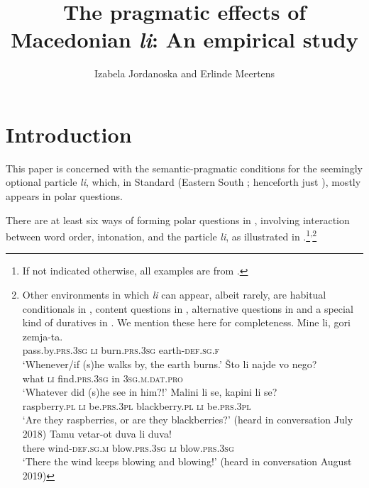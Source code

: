 \documentclass[output=paper,
colorlinks,
citecolor=brown,
newtxmath
]{langscibook}
\author{Izabela Jordanoska\affiliation{University of Vienna} and Erlinde Meertens\affiliation{University of Konstanz}}
\title[The pragmatic effects of Macedonian \textup{li}: An empirical study]
      {The pragmatic effects of Macedonian \textit{li}: An empirical study}
\begin{document}
\maketitle

\section{Introduction}

This paper is concerned with the semantic-pragmatic conditions for the seemingly optional particle \textit{li}, which, in Standard  (Eastern South ; henceforth just ), mostly appears in polar questions.

There are at least six ways of forming polar questions in , involving interaction between word order, intonation, and the particle \textit{li}, as illustrated in .\footnote{If not indicated otherwise, all examples are from .}\textsuperscript{,}\footnote{Other environments in which \textit{li} can appear, albeit rarely, are habitual conditionals in , content questions in , alternative questions in  and a special kind of duratives in . We mention these here for completeness.
\ea
\ea \gll Mine li, gori zemja-ta.\\
    pass.by.\textsc{prs.3sg} \textsc{li} burn.\textsc{prs.3sg} earth-\textsc{def.sg.f}\\
    \glt `Whenever/if (s)he walks by, the earth burns.' \label{cond} \hfill  \citep[539]{koneski1987}
        \ex \gll Što li najde vo nego? \\
what \textsc{li} find.\textsc{prs.3sg} in \textsc{3sg.m.dat.pro} \\
\glt `Whatever did (s)he see in him?!' \label{sto} \hfill  \citep[561]{Rudin.Kramer.Billings.Baerman1999}
        \ex  \gll Malini li se, kapini li se? \\
raspberry.\textsc{pl} \textsc{li} be.\textsc{prs.3pl} blackberry.\textsc{pl} \textsc{li} be.\textsc{prs.3pl} \\
\glt `Are they raspberries, or are they blackberries?' \label{altq}  \hfill  (heard in conversation July 2018)
        \ex \gll Tamu vetar-ot duva li duva! \\
there wind-\textsc{def.sg.m} blow.\textsc{prs.3sg} \textsc{li} blow.\textsc{prs.3sg} \\ \glt
`There the wind keeps blowing and blowing!'  \label{dur} \hfill (heard in conversation August 2019)

\z\z}
\end{document}
